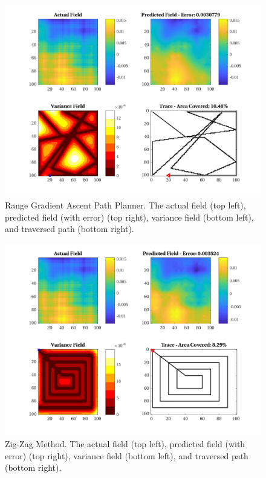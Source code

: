 \begin{figure}[htb!]
    \centering
    \includegraphics[width=0.8\linewidth]{figures/sim_figures/gr_10p_100x100_sf_50_seed_2}
    \captionsetup{skip=0.25\baselineskip}
    \ssp
    \caption{Range Gradient Ascent Path Planner. The actual field (top left), predicted field (with error) (top right), variance field (bottom left), and traversed path (bottom right).}
\end{figure}

\begin{figure}[htb!]
    \centering
    \includegraphics[width=0.8\linewidth]{figures/sim_figures/zz_10p_100x100_sf_50_seed_2}
    \captionsetup{skip=0.25\baselineskip}
    \ssp
    \caption{Zig-Zag Method. The actual field (top left), predicted field (with error) (top right), variance field (bottom left), and traversed path (bottom right).}
\end{figure}

